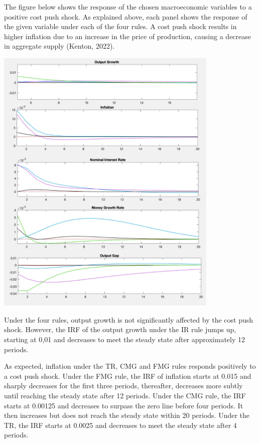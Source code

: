 \documentclass[11pt,preprint, authoryear]{elsarticle}
\let\origfigure\figure
\let\endorigfigure\endfigure
\renewenvironment{figure}[1][2] {
    \expandafter\origfigure\expandafter[H]
} {
    \endorigfigure
}
\numberwithin{equation}{section}
\numberwithin{figure}{section}
\numberwithin{table}{section}
\begin{document}
The figure below shows the response of the chosen macroeconomic
variables to a positive cost push shock. As explained above, each panel
shows the response of the given variable under each of the four rules. A
cost push shock results in higher inflation due to an increase in the
price of production, causing a decrease in aggregate supply (Kenton,
2022).

\begin{figure}
\centering
\includegraphics[width=0.8\textwidth,height=0.6\textheight]{./figures/cost-push-shock.jpeg}
\caption{Plots of Impulse Response Functions for a Cost Push Shock}
\end{figure}

Under the four rules, output growth is not significantly affected by the
cost push shock. However, the IRF of the output growth under the IR rule
jumps up, starting at 0,01 and decreases to meet the steady state after
approximately 12 periods.

As expected, inflation under the TR, CMG and FMG rules responds
positively to a cost push shock. Under the FMG rule, the IRF of
inflation starts at 0.015 and sharply decreases for the first three
periods, thereafter, decreases more subtly until reaching the steady
state after 12 periods. Under the CMG rule, the IRF starts at 0.00125
and decreases to surpass the zero line before four periods. It then
increases but does not reach the steady state within 20 periods. Under
the TR, the IRF starts at 0.0025 and decreases to meet the steady state
after 4 periods.
\end{document}
